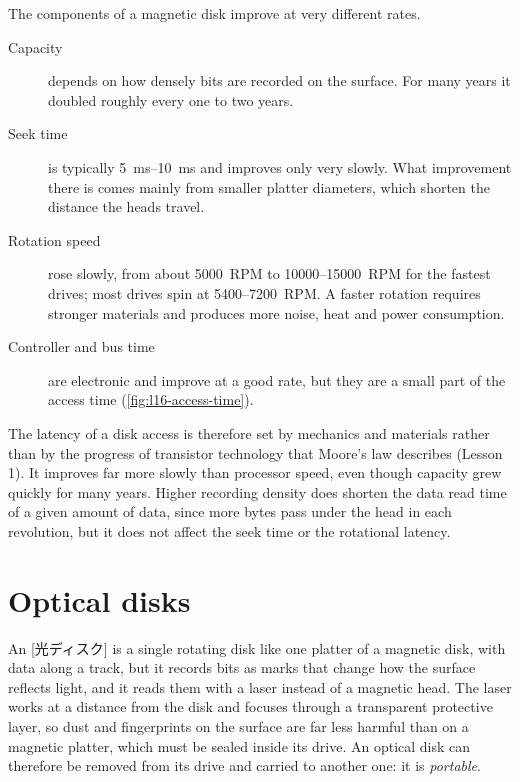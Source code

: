 \documentclass[../main.tex]{subfiles}
\begin{document}
The components of a magnetic disk improve at very different
rates.
\begin{description}
  \item[Capacity] depends on how densely bits are recorded on the surface.
    For many years it doubled roughly every one to two years.%
  \item[Seek time] is typically \SIrange{5}{10}{\milli\second} and improves
    only very slowly.  What improvement there is comes mainly from smaller
    platter diameters, which shorten the distance the heads
    travel.
  \item[Rotation speed] rose slowly, from about \num{5000}~RPM to
    \num{10000}--\num{15000}~RPM for the fastest drives; most drives spin at
    \num{5400}--\num{7200}~RPM.  A faster rotation requires stronger
    materials and produces more noise, heat and power consumption.
  \item[Controller and bus time] are electronic and improve at a good rate,
    but they are a small part of the access time (\cref{fig:l16-access-time}).
\end{description}

The latency of a disk access is therefore set by mechanics and materials
rather than by the progress of transistor technology that Moore's law
describes (Lesson 1).
It improves far more slowly than processor speed, even
though capacity grew quickly for many years.  Higher recording density does
shorten the data read time of a given amount of data, since more bytes pass
under the head in each revolution, but it does not affect the seek time or
the rotational latency.

\section{Optical disks}
\label{sec:l16-optical}

An [光ディスク] is a single rotating disk like one platter
of a magnetic disk, with data along a track, but it records bits as marks that
change how the surface reflects light, and it reads them with a laser
instead of a magnetic head.  The laser works at a
distance from the disk and focuses through a transparent protective layer,
so dust and fingerprints on the surface are far less harmful than on a
magnetic platter, which must be sealed inside its drive.  An optical disk can
therefore be removed from its drive and carried to another one: it is
\emph{portable}.
\end{document}

